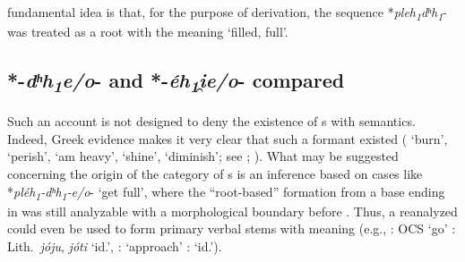 \documentclass[output=paper,colorlinks,citecolor=brown]{langscibook}
\begin{document}
fundamental idea is that, for the purpose of derivation, the sequence   *\textit{pleh\textsubscript{1}dʰh\textsubscript{1}}- was treated as a root with the meaning ‘filled, full’.

\subsection{*-\textit{dʰh\textsubscript{1}e/o}- and *-\textit{éh\textsubscript{1}i̯e/o}- compared}

Such an account is not designed to deny the existence of s  with  semantics. Indeed, Greek evidence makes it very clear that such a formant existed ( ‘burn’,  ‘perish’,  ‘am heavy’,  ‘shine’,  ‘diminish’; see \citealt[268]{Magni2008}; \citealt[18--24]{RothsteinDowden2022}). What may be suggested concerning the origin of the category of s is an inference based on cases like   *\textit{pléh\textsubscript{1}-dʰh\textsubscript{1}-e/o}- ‘get full’, where the “root-based” formation from a base ending in  was still analyzable with a morphological boundary before . Thus, a reanalyzed  could even be used to form primary verbal stems with  meaning (e.g.,  : OCS  ‘go’ : Lith.\ \textit{jóju}, \textit{jóti} ‘id.’,  :  ‘approach’ :  ‘id.’). 
\end{document}
